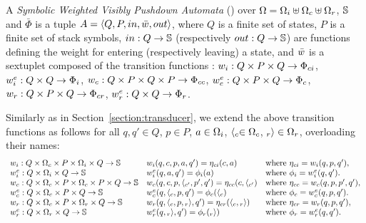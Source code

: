 \begin{definition}
A \emph{Symbolic Weighted Visibly Pushdown Automata} (\SWVPA) 
over  $\Omega = \Omegai \uplus \Omegac \uplus \Omegar$, $\mathbb{S}$ and $\bar\Phi$ 
is a tuple $A = \< Q, P, \init, \bar\wei, \final >$,
where $Q$ is a finite set of states, 
$P$ is a finite set of stack symbols, 
$\mathsf{in} : Q \to \Semiring$ 
(respectively $\mathsf{out} : Q \to \Semiring$)
are functions defining the weight for entering
(respectively leaving) a state, 
and $\bar\wei$ is a sextuplet composed of the transition functions :
$\weii : Q \times P \times Q \to \Phici$,  
$\weiei : Q \times Q \to \Phii$,  
$\weic : Q \times P \times Q \times P \to \Phicc$,  
$\weiec : Q \times P \times Q \to \Phic$,  
$\weir : Q \times P \times Q \to \Phicr$,  
$\weier : Q \times Q \to \Phir$.
\end{definition}
%
Similarly as in Section~\ref{section:transducer}, 
we extend the above transition functions as follows
for all $q, q' \in Q$, $p \in P$, 
$a \in \Omegai$, 
$\call{c} \in \Omegac$, 
$\return{r} \in \Omegar$, 
overloading their names: %
\[
\begin{array}{lll}
\weii: Q \times \Omegac \times P \times \Omegai \times Q \to \Semiring & 
\weii(q, c, p, a, q') = \eta_\mathsf{ci}(c, a) & 
\mathrm{where~} \eta_\mathsf{ci} = \weii(q, p, q'),\\
%
\weiei: Q \times \Omegai \times Q \to \Semiring & 
\weiei(q, a, q') = \phi_\mathsf{i}(a) &
\mathrm{where~} \phi_\mathsf{i} = \weiei(q, q').\\
%
\weic: Q \times \Omegac \times P \times  \Omegac \times P \times Q \to \Semiring & 
\weic(q, c, p, \call{c'}, p', q') = \eta_\mathsf{cc}(c, \call{c'}) & 
\mathrm{where~} \eta_\mathsf{cc} = \weic(q, p, p', q'),\\
%
\weiec: Q \times \Omegac \times P \times Q \to \Semiring & 
\weiec(q, {\call{c}}, p, q') = \phi_\mathsf{c}({\call{c}}) &
\mathrm{where~} \phi_\mathsf{c} = \weiec(q, p, q').\\
%
\weir: Q \times \Omegac \times P \times \Omegar \times Q \to \Semiring & 
\weir(q, {\call{c}},  p, {\return{r}}, q') = \eta_\mathsf{cr}({\call{c}},  {\return{r}}) & 
\mathrm{where~} \eta_\mathsf{cr} = \weir(q, p, q'),\\
%
\weier: Q \times \Omegar \times Q \to \Semiring & 
\weier(q, {\return{r}}, q') = \phi_\mathsf{r}({\return{r}}) &
\mathrm{where~} \phi_\mathsf{r} = \weier(q, q').\\
\end{array}      
\]


